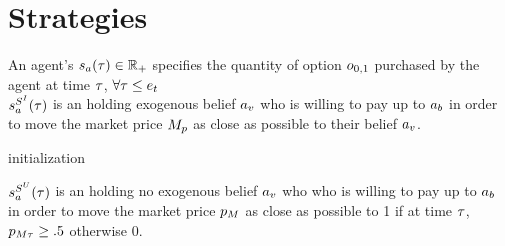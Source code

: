\section{Strategies}
An agent's  
$s_a(\tau) \in \mathbb{R}_+$ specifies the quantity of option 
$o_{0,1}$ purchased by the agent at time $\tau$, $\forall \tau \leq e_t$\\

$s^{S^I}_a(\tau)$ is an  holding exogenous belief $a_v$ who is willing to pay up to $a_b$ in order to move the market price $M_p$ as close as possible to their belief $a_v$. \\

\begin{algorithm}[H]
\SetAlgoLined
{}
initialization\\
\end{algorithm}

$s^{S^U}_a(\tau)$ is an  holding no exogenous belief $a_v$ who who is willing to pay up to $a_b$ in order to move the market price $p_M$ as close as possible to 1 if at time $\tau$, $p_{M\tau} \ge .5$ otherwise 0. \\

